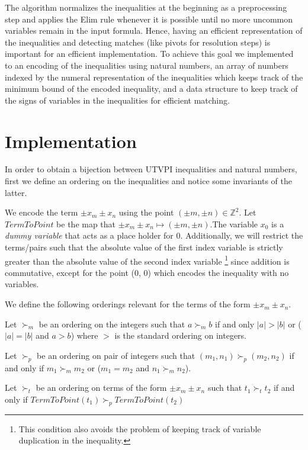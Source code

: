 The algorithm normalizes the inequalities at the beginning as 
a preprocessing step and applies the Elim rule whenever it is
possible until no more uncommon variables remain in the 
input formula. Hence, having an efficient representation of 
the inequalities and detecting matches (like pivots for
resolution steps) is important for an efficient implementation.
To achieve this goal we implemented to an encoding of 
the inequalities using natural numbers, an array of 
numbers indexed by the numeral representation of the  inequalities
which keeps track of the minimum bound of the encoded inequality,
and a data structure to keep track of the signs of variables
in the inequalities for efficient matching.

%

\section{Implementation}

In order to obtain a bijection between UTVPI inequalities and
natural numbers, first we define an ordering on the inequalities
and notice some invariants of the latter. 

We encode the term $\pm x_m \pm x_n$ using the point
$(\pm m, \pm n) \in \mathbb{Z}^2$. Let $TermToPoint$ be the map
that $\pm x_m \pm x_n \mapsto (\pm m, \pm n)$.The variable $x_0$ is a
\emph{dummy variable} that acts as a place holder for 0. 
Additionally, we will restrict the terms/pairs such that the absolute
value of the first index variable is strictly greater than the
absolute value of the second index variable \footnote{This condition also
  avoids the problem of keeping track of variable duplication in 
the inequality.} since addition is commutative, except for the point
(0, 0) which encodes the inequality with no variables.

We define the following orderings relevant for the terms of the form
$\pm x_m \pm x_n$.

\begin{definition} 
  Let $\succ_m$ be an ordering on the integers such that $a \succ_m b$
  if and only $|a| > |b|$ or ($|a| = |b|$ and $a > b$) where $>$ is the
  standard ordering on integers.

  Let $\succ_p$ be an ordering on pair of integers such that 
  $(m_1, n_1) \succ_p (m_2, n_2)$ if and only if $m_1 \succ_m m_2$
  or ($m_1 = m_2$ and $n_1 \succ_m n_2$).

  Let $\succ_t$ be an ordering on terms of the form $\pm x_m \pm x_n$
  such that $t_1 \succ_t t_2$ if and only if $TermToPoint(t_1) \succ_p TermToPoint(t_2)$
\end{definition}

